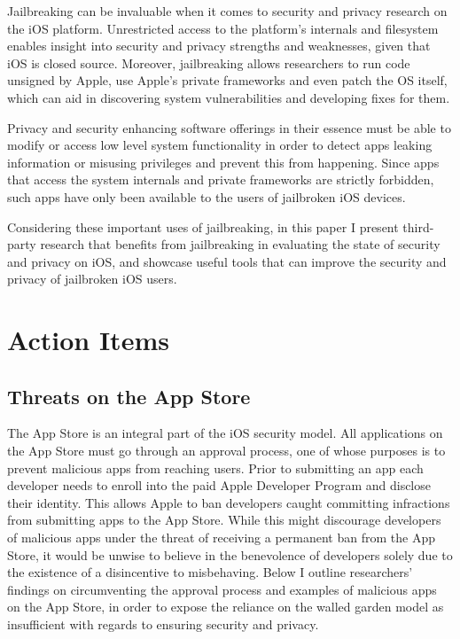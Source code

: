 \documentclass[12pt, titlepage, oneside]{article}
\begin{document}
Jailbreaking can be invaluable when it comes to security and privacy research on the iOS platform. Unrestricted access to the platform's internals and filesystem enables insight into security and privacy strengths and weaknesses, given that iOS is closed source. Moreover, jailbreaking allows researchers to run code unsigned by Apple, use Apple's private frameworks and even patch the OS itself, which can aid in discovering system vulnerabilities and developing fixes for them. 

Privacy and security enhancing software offerings in their essence must be able to modify or access low level system functionality in order to detect apps leaking information or misusing privileges and prevent this from happening. Since apps that access the system internals and private frameworks are strictly forbidden, such apps have only been available to the users of jailbroken iOS devices. 

Considering these important uses of jailbreaking, in this paper I present third-party research that benefits from jailbreaking in evaluating the state of security and privacy on iOS, and showcase useful tools that can improve the security and privacy of jailbroken iOS users.
\section{Action Items}

\subsection{Threats on the App Store}

The App Store is an integral part of the iOS security model. All applications on the App Store must go through an approval process, one of whose purposes is to prevent malicious apps from reaching users. Prior to submitting an app each developer needs to enroll into the paid Apple Developer Program and disclose their identity. This allows Apple to ban developers caught committing infractions from submitting apps to the App Store. While this might discourage developers of malicious apps under the threat of receiving a permanent ban from the App Store, it would be unwise to believe in the benevolence of developers solely due to the existence of a disincentive to misbehaving. Below I outline researchers' findings on circumventing the approval process and examples of malicious apps on the App Store, in order to expose the reliance on the walled garden model as insufficient with regards to ensuring security and privacy. 
\end{document}
